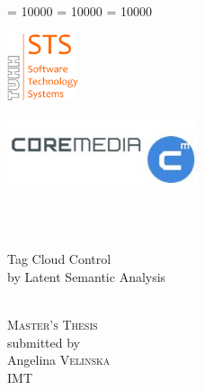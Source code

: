 \documentclass[12pt,a4paper]{extreport}
\begin{document}
\clubpenalty = 10000
\widowpenalty = 10000 
\displaywidowpenalty = 10000

\newenvironment{summary}{\begin{quotation}\it\textbf{Summary.\space}}{\end{quotation}\vspace{0.3cm}}
\begin{titlepage}


\begin{minipage}{1\linewidth}
\begin{flushright}
\begin{minipage}[h]{0.4\linewidth}
\includegraphics[height=2cm]{img/sts}
\end{minipage}
\hspace{0.5cm}
\begin{minipage}[h]{0.4\linewidth}
\includegraphics[height=2cm]{img/CoremediaLogo}
\end{minipage}\\
\bigskip
\Huge
\hrulefill\\
\bigskip
\begin{center}
Tag Cloud Control \\
by Latent Semantic Analysis\\
\end{center}
\hrulefill\\ 
\bigskip 
\bigskip
\large \textsc{Master's Thesis}\\
\medskip
\normalsize submitted by\\
\large
Angelina \textsc{Velinska}\\
\normalsize IMT\\
\end{flushright}
\end{minipage}

\vspace{2.5cm}

\begin{minipage}[b]{1\linewidth}
\begin{flushleft}


\end{flushleft}
\end{minipage}
\end{titlepage}
\end{document}
